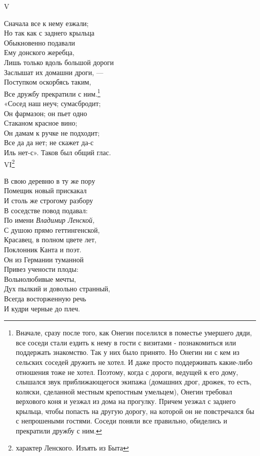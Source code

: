 V

Сначала все к нему езжали;\\
Но так как с заднего крыльца\\
Обыкновенно подавали\\
Ему донского жеребца,\\
Лишь только вдоль большой дороги\\
Заслышат их домашни дроги, —\\
Поступком оскорбясь таким,\\
Все дружбу прекратили с ним.\footnote{Вначале, сразу после того, как Онегин поселился в поместье умершего дяди, все соседи стали ездить к нему в гости с визитами - познакомиться или поддержать знакомство. Так у них было принято. 
Но Онегин ни с кем из сельских соседей дружить не хотел. И даже просто поддерживать какие-либо отношения тоже не хотел. Поэтому, когда с дороги, ведущей к его дому, слышался звук приближающегося экипажа (домашних дрог, дрожек, то есть, коляски, сделанной местным крепостным умельцем), Онегин требовал верхового коня и уезжал из дома на прогулку. Причем уезжал с заднего крыльца, чтобы попасть на другую дорогу, на которой он не повстречался бы с непрошеными гостями.
Соседи поняли все правильно, обиделись и прекратили дружбу с ним.}\\
«Сосед наш неуч; сумасбродит;\\
Он фармазон; он пьет одно\\
Стаканом красное вино;\\
Он дамам к ручке не подходит;\\
Все да да нет; не скажет да-с\\
Иль нет-с». Таков был общий глас.\\

VI\footnote{характер Ленского. Изъять из Быта}

В свою деревню в ту же пору\\
Помещик новый прискакал\\
И столь же строгому разбору\\
В соседстве повод подавал:\\
По имени \emph{Владимир Ленской,}\\
С душою прямо геттингенской,\\
Красавец, в полном цвете лет,\\
Поклонник Канта и поэт.\\
Он из Германии туманной\\
Привез учености плоды:\\
Вольнолюбивые мечты,\\
Дух пылкий и довольно странный,\\
Всегда восторженную речь\\
И кудри черные до плеч.\\

